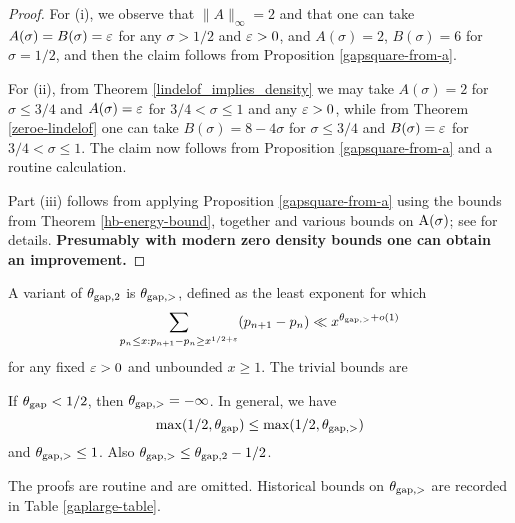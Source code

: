 \begin{proof} For (i), we observe that $\|A\|_\infty=2$ and that one can take $A(\sigma)=B(\sigma)=\varepsilon$ for any $\sigma>1/2$ and $\varepsilon>0$, and $A(\sigma)=2$, $B(\sigma)=6$ for $\sigma=1/2$, and then the claim follows from Proposition \ref{gapsquare-from-a}.

For (ii), from Theorem \ref{lindelof_implies_density} we may take $A(\sigma)=2$ for $\sigma \leq 3/4$ and $A(\sigma)=\varepsilon$ for $3/4 < \sigma \leq 1$ and any $\varepsilon>0$, while from Theorem \ref{zeroe-lindelof} one can take $B(\sigma) = 8-4\sigma$ for $\sigma \leq 3/4$ and $B(\sigma)=\varepsilon$ for $3/4 < \sigma \leq 1$.  The claim now follows from Proposition \ref{gapsquare-from-a} and a routine calculation.

Part (iii) follows from applying Proposition \ref{gapsquare-from-a} using the bounds from Theorem \ref{hb-energy-bound}, together and various bounds on $\mathrm{A}(\sigma)$; see \cite[Theorem 12.14]{ivic} for details.  {\bf Presumably with modern zero density bounds one can obtain an improvement.}
\end{proof}

A variant of $\theta_{\mathrm{gap},2}$ is $\theta_{\mathrm{gap},>}$, defined as the least exponent for which
$$ \sum_{p_n \leq x: p_{n+1}-p_n \geq x^{1/2+\varepsilon}} (p_{n+1}-p_n) \ll x^{\theta_{\mathrm{gap},>}+o(1)}$$
for any fixed $\varepsilon>0$ and unbounded $x \geq 1$.  The trivial bounds are

\begin{proposition}\label{trivial-large-gap}  If $\theta_{\mathrm{gap}} < 1/2$, then $\theta_{\mathrm{gap},>} = -\infty$.  In general, we have
    $$ \max(1/2,\theta_{\mathrm{gap}}) \leq \max(1/2, \theta_{\mathrm{gap},>})$$
    and $\theta_{\mathrm{gap},>} \leq 1$.  Also $\theta_{\mathrm{gap},>} \leq \theta_{\mathrm{gap},2} - 1/2$.
\end{proposition}

The proofs are routine and are omitted.  Historical bounds on $\theta_{\mathrm{gap},>}$ are recorded in Table \ref{gaplarge-table}.


